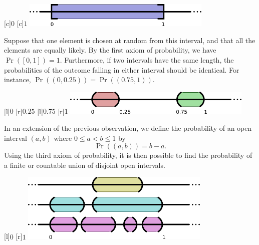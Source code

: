 \begin{center}
\begin{psfrags}
[c]{$0$}
[c]{$1$}
\includegraphics[height=1.17cm]{Figures/2Chapter/uncountablespace}
\end{psfrags}
\end{center}

Suppose that one element is chosen at random from this interval, and that all the elements are equally likely.
By the first axiom of probability, we have $\Pr \left( [0,1] \right) = 1$.
Furthermore, if two intervals have the same length, the probabilities of the outcome falling in either interval should be identical.
For instance,
$\Pr \left( \left( 0, 0.25 \right) \right)
= \Pr \left( \left( 0.75, 1 \right) \right)$.

\begin{center}
\begin{psfrags}
[l]{$0$}
[r]{$0.25$}
[l]{$0.75$}
[r]{$1$}
\includegraphics[height=1.18cm]{Figures/2Chapter/intervals}
\end{psfrags}
\end{center}

In an extension of the previous observation, we define the probability of an open interval $(a, b)$ where $0 \leq a < b \leq 1$ by
\begin{equation} \label{equation:DefinitionProbabilityLaw1}
\Pr ( (a,b) ) = b - a .
\end{equation}
Using the third axiom of probability, it is then possible to find the probability of a finite or countable union of disjoint open intervals.

\begin{center}
\begin{psfrags}
[l]{$0$}
[r]{$1$}
\includegraphics[height=3.285cm]{Figures/2Chapter/lineintervals}
\end{psfrags}
\end{center}

